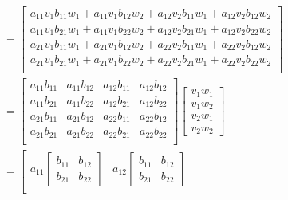\documentclass[main.tex]{subfiles}
\begin{document}
\begin{enumerate}
\begin{align*}
                                    & = \left[\begin{array}{l} 
                                    a_{11}v_{1}b_{11}w_{1} + a_{11}v_{1}b_{12}w_{2} + a_{12}v_{2}b_{11}w_{1} + a_{12}v_{2}b_{12}w_{2}\\ 
                                    a_{11}v_{1}b_{21}w_{1} + a_{11}v_{1}b_{22}w_{2} + a_{12}v_{2}b_{21}w_{1} + a_{12}v_{2}b_{22}w_{2}\\
                                    a_{21}v_{1}b_{11}w_{1} + a_{21}v_{1}b_{12}w_{2} + a_{22}v_{2}b_{11}w_{1} + a_{22}v_{2}b_{12}w_{2}\\
                                    a_{21}v_{1}b_{21}w_{1} + a_{21}v_{1}b_{22}w_{2} + a_{22}v_{2}b_{21}w_{1} + a_{22}v_{2}b_{22}w_{2}\\
                                    \end{array}\right]\\
                                    & = \left[\begin{array}{llll} 
                                    a_{11}b_{11} & a_{11}b_{12} & a_{12}b_{11} & a_{12}b_{12}\\ 
                                    a_{11}b_{21} & a_{11}b_{22} & a_{12}b_{21} & a_{12}b_{22}\\
                                    a_{21}b_{11} & a_{21}b_{12} & a_{22}b_{11} & a_{22}b_{12}\\
                                    a_{21}b_{21} & a_{21}b_{22} & a_{22}b_{21} & a_{22}b_{22}\\
                                    \end{array}\right]
                                    \left[\begin{array}{l} v_{1} w_{1} \\ v_{1} w_{2} \\ v_{2} w_{1} \\ v_{2} w_{2} \end{array}\right]\\
                                    & = \left[\begin{array}{ll} 
                                    a_{11} \left[\begin{array}{ll} b_{11} & b_{12} \\ b_{21} & b_{22} \end{array}\right] 
                                    & a_{12}\left[\begin{array}{ll} b_{11} & b_{12} \\ b_{21} & b_{22} \end{array}\right] \\

\end{array}
\end{align*}
\end{enumerate}
\end{document}
